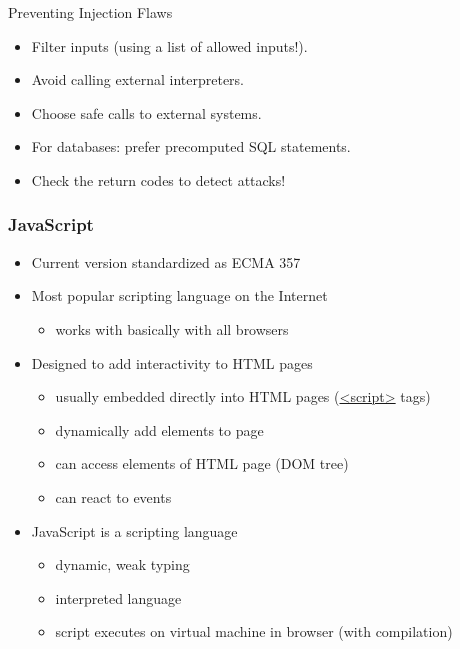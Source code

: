 \documentclass{beamer}
\begin{document}
\begin{printout}
\begin{slide}{Preventing Injection Flaws}
  \begin{itemize}\itemsep=1.5ex
    \item Filter inputs (using a list of allowed inputs!).
    \item Avoid calling external interpreters.
    \item Choose safe calls to external systems. 
    \item For databases: prefer precomputed SQL statements.
    \item Check the return codes to detect attacks!
  \end{itemize}
\end{slide}
\end{printout}

\begin{frame}\frametitle{JavaScript}
\begin{itemize}\itemsep=1.5ex
\item Current version standardized as ECMA 357
\item Most popular scripting language on the Internet
  \begin{itemize}
  \item works with basically with all browsers
  \end{itemize}
\item Designed to add interactivity to HTML pages
  \begin{itemize}
  \item usually embedded directly into HTML pages (\url{<script>} tags)
  \item dynamically add elements to page
  \item can access elements of HTML page (DOM tree)
  \item can react to events
  \end{itemize}
\item JavaScript is a scripting language
    \begin{itemize}
    \item dynamic, weak typing
    \item interpreted language
    \item script executes on virtual machine in browser (with compilation)
    \end{itemize}  
\end{itemize}
\end{frame}
\end{document}
